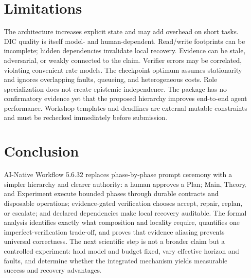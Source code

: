 \documentclass[11pt]{article}
\begin{document}
\section{Limitations}
The architecture increases explicit state and may add overhead on short tasks. DIC quality is itself model- and human-dependent. Read/write footprints can be incomplete; hidden dependencies invalidate local recovery. Evidence can be stale, adversarial, or weakly connected to the claim. Verifier errors may be correlated, violating convenient rate models. The checkpoint optimum assumes stationarity and ignores overlapping faults, queueing, and heterogeneous costs. Role specialization does not create epistemic independence. The package has no confirmatory evidence yet that the proposed hierarchy improves end-to-end agent performance. Workshop templates and deadlines are external mutable constraints and must be rechecked immediately before submission.

\section{Conclusion}
AI-Native Workflow 5.6.32 replaces phase-by-phase prompt ceremony with a simpler hierarchy and clearer authority: a human approves a Plan; Main, Theory, and Experiment execute bounded phases through durable contracts and disposable operations; evidence-gated verification chooses accept, repair, replan, or escalate; and declared dependencies make local recovery auditable. The formal analysis identifies exactly what composition and locality require, quantifies one imperfect-verification trade-off, and proves that evidence aliasing prevents universal correctness. The next scientific step is not a broader claim but a controlled experiment: hold model and budget fixed, vary effective horizon and faults, and determine whether the integrated mechanism yields measurable success and recovery advantages.

\appendix
\end{document}
